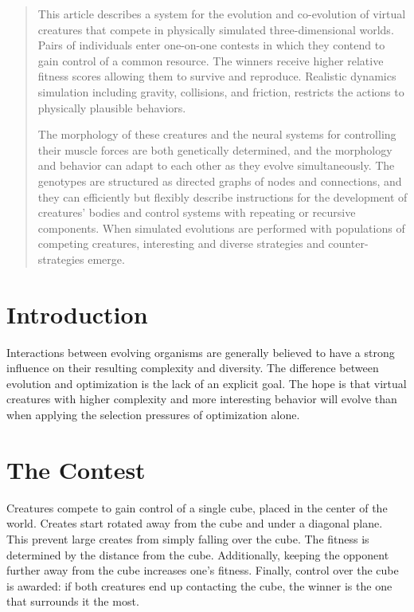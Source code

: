 \documentclass[../main.tex]{subfiles}
\begin{document}
\begin{abstract}
This article describes a system for the evolution and co-evolution of virtual creatures that compete in physically
simulated three-dimensional worlds. Pairs of individuals enter one-on-one contests in which they contend to gain
control of a common resource. The winners receive higher relative fitness scores allowing them to survive and
reproduce. Realistic dynamics simulation including gravity, collisions, and friction, restricts the actions to
physically plausible behaviors.

The morphology of these creatures and the neural systems for controlling their muscle forces are both genetically
determined, and the morphology and behavior can adapt to each other as they evolve simultaneously. The genotypes are
structured as directed graphs of nodes and connections, and they can efficiently but flexibly describe instructions for
the development of creatures' bodies and control systems with repeating or recursive components. When simulated
evolutions are performed with populations of competing creatures, interesting and diverse strategies and counter-
strategies emerge.
\end{abstract}

\begin{mdframed}
\end{mdframed}

\section{Introduction}

Interactions between evolving organisms are generally believed to have a strong influence on their resulting complexity
and diversity. The difference between evolution and optimization is the lack of an explicit goal. The hope is that
virtual creatures with higher complexity and more interesting behavior will evolve than when applying the selection
pressures of optimization alone.

\section{The Contest}

Creatures compete to gain control of a single cube, placed in the center of the world. Creates start rotated away from
the cube and under a diagonal plane. This prevent large creates from simply falling over the cube. The fitness is
determined by the distance from the cube. Additionally, keeping the opponent further away from the cube increases one's
fitness. Finally, control over the cube is awarded: if both creatures end up contacting the cube, the winner is the one
that surrounds it the most.
\end{document}
